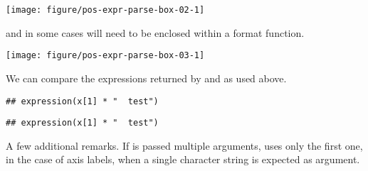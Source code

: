 \documentclass[krantz2]{krantz}\usepackage{knitr}%
\begin{document}
\begin{explainbox}
\begin{knitrout}
{\centering \texttt{[image: figure/pos-expr-parse-box-02-1]} 

}



\end{knitrout}

and in some cases will need to be enclosed within a format function.

\begin{knitrout}\footnotesize
{}\color{fgcolor}\begin{kframe}
\begin{alltt}
  \hlopt{+}
  \hlstd{()} \hlopt{+}
  \hlstd{(}\hlstd{(} \hlstd{=} \hlstd{))}
\end{alltt}
\end{kframe}

{\centering \texttt{[image: figure/pos-expr-parse-box-03-1]} 

}



\end{knitrout}

We can compare the expressions returned by  and  as used above.

\begin{knitrout}\footnotesize
{}\color{fgcolor}\begin{kframe}
\begin{alltt}
\hlstd{(x[}\hlstd{]}\hlopt{*}\hlstd{)}
\end{alltt}
\begin{verbatim}
## expression(x[1] * "  test")
\end{verbatim}
\begin{alltt}
\hlstd{(} \hlstd{=} \hlstd{)}
\end{alltt}
\begin{verbatim}
## expression(x[1] * "  test")
\end{verbatim}
\end{kframe}
\end{knitrout}

A few additional remarks. If  is passed multiple arguments,  uses only the first one, in the case of axis labels, when a single character string is expected as argument.


\end{explainbox}
\end{document}
